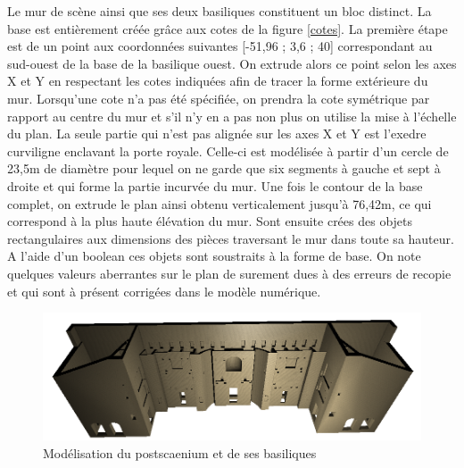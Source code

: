 Le mur de scène ainsi que ses deux basiliques constituent un bloc distinct. La base est entièrement créée grâce aux cotes de la figure \ref{cotes}. La première étape est de un point aux coordonnées suivantes [-51,96 ; 3,6 ; 40]  correspondant au sud-ouest de la base de la basilique ouest. On extrude alors ce point selon les axes X et Y en respectant les cotes indiquées afin de tracer la forme extérieure du mur. Lorsqu'une cote n'a pas été spécifiée, on prendra la cote symétrique par rapport au centre du mur et s'il n'y en a pas non plus on utilise la mise à l'échelle du plan. La seule partie qui n'est pas alignée sur les axes X et Y est l'\gls{exedre} curviligne enclavant la porte royale. Celle-ci est modélisée à partir d'un cercle de 23,5m de diamètre pour lequel on ne garde que six segments à gauche et sept à droite et qui forme la partie incurvée du mur. Une fois le contour de la base complet, on extrude le plan ainsi obtenu verticalement jusqu'à 76,42m, ce qui correspond à la plus haute élévation du mur.
Sont ensuite crées des objets rectangulaires aux dimensions des pièces traversant le mur dans toute sa hauteur. A l'aide d'un \gls{boolean} ces objets sont soustraits à la forme de base. On note quelques valeurs aberrantes sur le plan de \cite[Pl. XXI]{orangePl} surement dues à des erreurs de recopie et qui sont à présent corrigées dans le modèle numérique. 

\begin{figure}[!h]
	\includegraphics[width=\linewidth]{images/modMur}
	\caption{Modélisation du \gls{postscaenium} et de ses \glspl{basilique}} 
	\label{modCavea} 
\end{figure} 

